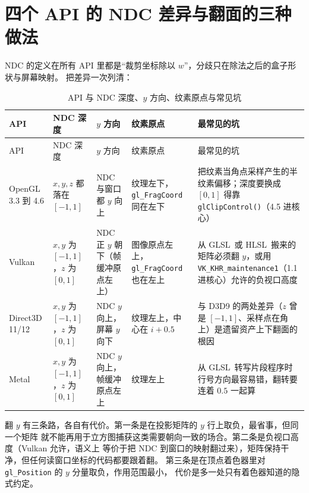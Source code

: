 \documentclass[12pt,a4paper,fontset=fandol]{ctexbook}
\newcommand{\Fn}[1]{\texttt{#1()}}
\newcommand{\Tp}[1]{\texttt{#1}}
\newcommand{\Bk}{\discretionary{}{}{}}
\newcommand{\Lang}[1]{\textsf{#1}}
\newcommand{\GSL}{\Lang{GLSL}}
\newcommand{\HSL}{\Lang{HLSL}}
\begin{document}
\section{四个 API 的 NDC 差异与翻面的三种做法}

NDC 的定义在所有 API 里都是``裁剪坐标除以 $w$''，分歧只在除法之后的盒子形状与屏幕映射。
把差异一次列清：

\begin{longtable}{>{\raggedright\arraybackslash}p{}
                  >{\raggedright\arraybackslash}p{}
                  >{\raggedright\arraybackslash}p{}
                  >{\raggedright\arraybackslash\small}p{}
                  >{\raggedright\arraybackslash\small}p{}}
\caption{API 与 NDC 深度、$y$ 方向、纹素原点与常见坑}\label{tab:ch04-ndc} \\
\toprule
API & NDC 深度 & $y$ 方向 & 纹素原点 & 最常见的坑 \\
\midrule
\endfirsthead
\toprule
API & NDC 深度 & $y$ 方向 & 纹素原点 & 最常见的坑 \\
\midrule
\endhead
\bottomrule
\endfoot
OpenGL 3.3 到 4.6 & $x,y,z$ 都落在 $[-1,1]$ & NDC 与窗口都 $y$ 向上 &
  纹理左下，\Tp{gl\_\Bk FragCoord} 同在左下 &
  把纹素当角点采样产生的半纹素偏移；深度要换成 $[0,1]$ 得靠 \Fn{glClipControl}（4.5 进核心） \\
Vulkan & $x,y$ 为 $[-1,1]$，$z$ 为 $[0,1]$ & NDC 正 $y$ 朝下（帧缓冲原点左上） &
  图像原点左上，\Tp{gl\_\Bk FragCoord} 也在左上 &
  从 \GSL\ 或 \HSL\ 搬来的矩阵必须翻 $y$，或用 \Tp{VK\_\Bk KHR\_\Bk maintenance1}（1.1 进核心）允许的负视口高度 \\
Direct3D 11/12 & $x,y$ 为 $[-1,1]$，$z$ 为 $[0,1]$ & NDC $y$ 向上，屏幕 $y$ 向下 &
  纹理左上，中心在 $i + 0.5$ &
  与 D3D9 的两处差异（$z$ 曾是 $[-1,1]$、采样点在角上）是遗留资产上下翻面的根因 \\
Metal & $x,y$ 为 $[-1,1]$，$z$ 为 $[0,1]$ & NDC $y$ 向上，帧缓冲原点左上 &
  纹理左上 &
  从 \GSL\ 转写片段程序时行号方向最容易错，翻转要连着 $0.5$ 一起算 \\
\end{longtable}

翻 $y$ 有三条路，各自有代价。第一条是在投影矩阵的 $y$ 行上取负，最省事，但同一个矩阵
就不能再用于立方图捕获这类需要朝向一致的场合。第二条是负视口高度（Vulkan 允许，语义上
等价于把 NDC 到窗口的映射翻过来），矩阵保持干净，但任何读窗口坐标的代码都要跟着翻。
第三条是在顶点着色器里对 \Tp{gl\_Position} 的 $y$ 分量取负，作用范围最小，
代价是多一处只有着色器知道的隐式约定。
\end{document}
